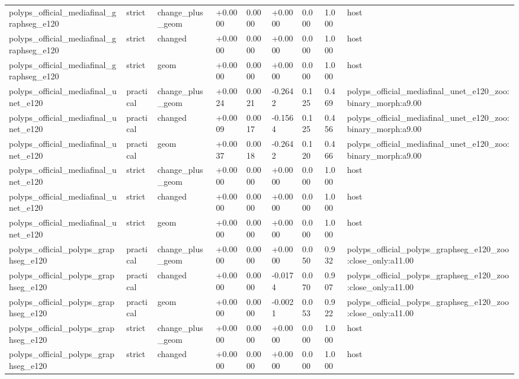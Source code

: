\begin{table}[t]
\begin{tabular}{lllllllll}
polyps\_official\_mediafinal\_graphseg\_e120 & strict & change\_plus\_geom & +0.0000 & 0.0000 & +0.0000 & 0.000 & 1.000 & host \\
polyps\_official\_mediafinal\_graphseg\_e120 & strict & changed & +0.0000 & 0.0000 & +0.0000 & 0.000 & 1.000 & host \\
polyps\_official\_mediafinal\_graphseg\_e120 & strict & geom & +0.0000 & 0.0000 & +0.0000 & 0.000 & 1.000 & host \\
polyps\_official\_mediafinal\_unet\_e120 & practical & change\_plus\_geom & +0.0024 & 0.0021 & -0.2642 & 0.125 & 0.469 & polyps\_official\_mediafinal\_unet\_e120\_zoo:binary\_morph:a9.00 \\
polyps\_official\_mediafinal\_unet\_e120 & practical & changed & +0.0009 & 0.0017 & -0.1564 & 0.125 & 0.456 & polyps\_official\_mediafinal\_unet\_e120\_zoo:binary\_morph:a9.00 \\
polyps\_official\_mediafinal\_unet\_e120 & practical & geom & +0.0037 & 0.0018 & -0.2642 & 0.120 & 0.466 & polyps\_official\_mediafinal\_unet\_e120\_zoo:binary\_morph:a9.00 \\
polyps\_official\_mediafinal\_unet\_e120 & strict & change\_plus\_geom & +0.0000 & 0.0000 & +0.0000 & 0.000 & 1.000 & host \\
polyps\_official\_mediafinal\_unet\_e120 & strict & changed & +0.0000 & 0.0000 & +0.0000 & 0.000 & 1.000 & host \\
polyps\_official\_mediafinal\_unet\_e120 & strict & geom & +0.0000 & 0.0000 & +0.0000 & 0.000 & 1.000 & host \\
polyps\_official\_polyps\_graphseg\_e120 & practical & change\_plus\_geom & +0.0000 & 0.0000 & +0.0000 & 0.050 & 0.932 & polyps\_official\_polyps\_graphseg\_e120\_zoo:close\_only:a11.00 \\
polyps\_official\_polyps\_graphseg\_e120 & practical & changed & +0.0000 & 0.0000 & -0.0174 & 0.070 & 0.907 & polyps\_official\_polyps\_graphseg\_e120\_zoo:close\_only:a11.00 \\
polyps\_official\_polyps\_graphseg\_e120 & practical & geom & +0.0000 & 0.0000 & -0.0021 & 0.053 & 0.922 & polyps\_official\_polyps\_graphseg\_e120\_zoo:close\_only:a11.00 \\
polyps\_official\_polyps\_graphseg\_e120 & strict & change\_plus\_geom & +0.0000 & 0.0000 & +0.0000 & 0.000 & 1.000 & host \\
polyps\_official\_polyps\_graphseg\_e120 & strict & changed & +0.0000 & 0.0000 & +0.0000 & 0.000 & 1.000 & host \\

\end{tabular}
\end{table}
